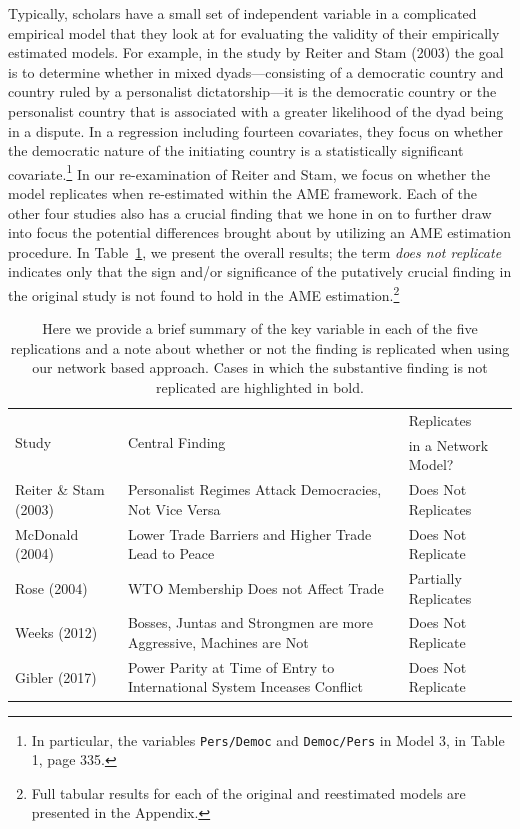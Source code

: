 Typically, scholars have a small set of independent variable in a complicated empirical model that they look at for evaluating the validity of their empirically estimated models. For example, in the study by Reiter and Stam (2003) the goal is to determine whether in mixed dyads---consisting of a democratic country and country ruled by a personalist dictatorship---it is the democratic country or the personalist country that is associated with a greater likelihood of the dyad being in a dispute.  In a regression including fourteen covariates, they focus on whether the democratic nature of the initiating country is a statistically significant covariate.\footnote{In particular, the variables \texttt{Pers/Democ} and \texttt{Democ/Pers} in Model 3, in Table 1, page 335.} In our re-examination of Reiter and Stam, we focus on whether the model replicates when re-estimated within the AME framework. Each of the other four studies also has a crucial finding that we hone in on to further draw into focus the potential differences brought about by utilizing an AME estimation procedure.  In Table~\ref{tab:modelFindingSumm}, we present the overall results; the term \textit{does not replicate} indicates only that the sign and/or significance of the putatively crucial finding in the original study is not found to hold in the AME estimation.\footnote{Full tabular results for each of the original and reestimated models are presented in the Appendix.}

\begin{table}[ht]
\centering
\caption{Here we provide a brief summary of the key variable in each of the five replications and a note about whether or not the finding is replicated when using our network based approach. Cases in which the substantive finding is not replicated are highlighted in bold.}
	\begin{tabular}{l p{7cm} l} \toprule
		\multirow{2}{*}{Study} & \multirow{2}{*}{Central Finding} &  Replicates \\ 
			& &  in a Network Model? \\ \toprule
		Reiter \& Stam (2003) & Personalist Regimes Attack Democracies, Not Vice Versa & {Does Not Replicates} \\ \midrule
		McDonald (2004) & Lower Trade Barriers and Higher Trade Lead to Peace & {Does Not Replicate}\\ \midrule
		Rose (2004) & WTO Membership Does not Affect Trade & {Partially Replicates}\\ \midrule
		Weeks (2012) & Bosses, Juntas and Strongmen are more Aggressive, Machines are Not & {Does Not Replicate} \\\midrule
		Gibler (2017) & Power Parity at Time of Entry to International System Inceases Conflict & {Does Not Replicate}\\ \bottomrule
	\end{tabular}
	\label{tab:modelFindingSumm}
\end{table}

